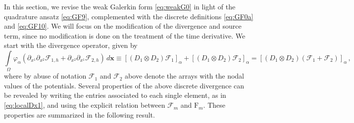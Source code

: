\documentclass[a4paper,10pt]{article}
\begin{document}
In this section, we revise the weak Galerkin form \eqref{eq:weakG0} in light of  the quadrature ansatz 
\eqref{eq:GF9}, complemented with  the discrete definitions  \eqref{eq:GF0a} and \eqref{eq:GF10}. We will focus on the modification
of the  divergence and source term, since no modification is done on the treatment of  the time derivative.
We start with the divergence operator,  given by \cite{barsukow2025structure,barsukow2025stationaritypreservingnodalfinite}
\begin{equation}\label{eq:GFdiv1}
\int\limits_\Omega\varphi_{\alpha}\left( \partial_{x^1} \partial_{x^2} \mathcal{F}_{1,h} + \partial_{x^2}\partial_{x^1} \mathcal{F}_{2,h}\right)\,d\mathbf{x}\equiv 
\left[( D_1\otimes D_2) \mathcal{F}_1 \right]_{\alpha} +\left[ (D_1\otimes D_2 )\mathcal{F}_2 \right]_{\alpha} = \left[( D_1\otimes D_2) (\mathcal{F}_1 +\mathcal{F}_2)\right]_{\alpha}  \,,
\end{equation}
where by abuse of notation $\mathcal{F}_1$ and $\mathcal{F}_2$ above denote the arrays with the nodal values of the potentials.
Several properties of the above discrete divergence can be revealed by  writing  the entries associated to each single element,  as in \eqref{eq:localDx1}, and using the explicit  relation between $\mathcal{F}_m$ and $\mathrm{F}_m$.
These properties are summarized in the     following result.
\end{document}
